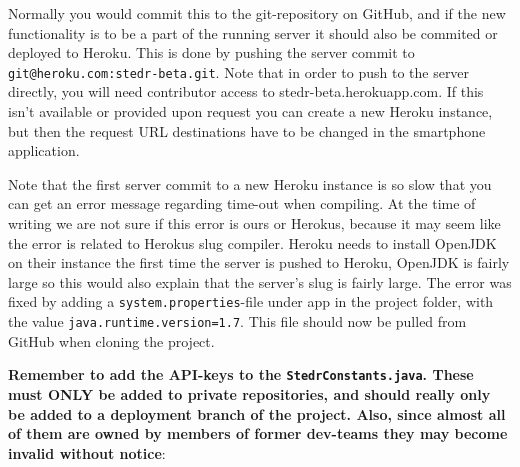 Normally you would commit this to the git-repository on GitHub, and if the new functionality is to be a part of the running server it should also be commited or deployed to Heroku. This is done by pushing the server commit to \texttt{git@heroku.com:stedr-beta.git}. Note that in order to push to the server directly, you will need contributor access to stedr-beta.herokuapp.com. If this isn't available or provided upon request you can create a new Heroku instance, but then the request URL destinations have to be changed in the smartphone application.

Note that the first server commit to a new Heroku instance is so slow that you can get an error message regarding time-out when compiling. At the time of writing we are not sure if this error is ours or Herokus, because it may seem like the error is related to Herokus slug compiler. Heroku needs to install OpenJDK on their instance the first time the server is pushed to Heroku, OpenJDK is fairly large so this would also explain that the server's slug is fairly large. The error was fixed by adding a \texttt{system.properties}-file under app in the project folder, with the value \texttt{java.runtime.version=1.7}. This file should now be pulled from GitHub when cloning the project.

\textbf{Remember to add the API-keys to the \texttt{StedrConstants.java}. These must ONLY be added to private repositories, and should really only be added to a deployment branch of the project. Also, since almost all of them are owned by members of former dev-teams they may become invalid without notice}:


